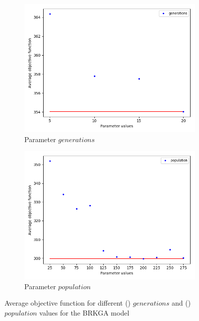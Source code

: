 \begin{figure}[H]
\begin{subfigure}[b]{.49\linewidth}
\centering
\includegraphics[width=0.8\linewidth]{./img/best-generation.png}
\caption{ Parameter $generations$}\label{fig2a}
\end{subfigure}\hfill
\begin{subfigure}[b]{.49\linewidth}
\centering
\includegraphics[width=0.8\linewidth]{./img/best-population.png}
\caption{Parameter $population$ }\label{fig2b}
\end{subfigure}\vfill
\caption{Average objective function for different () $generations$ and () $population$ values for the BRKGA model}
\label{fig_brkga_params2}
\end{figure}

